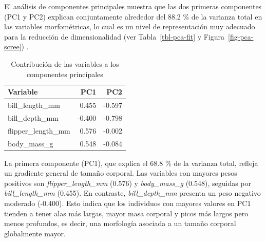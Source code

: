 \documentclass[
  spanish,
  11pt,
  a4paper,
  DIV=11,
  numbers=noendperiod]{scrartcl}
\newenvironment{Shaded}{\begin{snugshade}}{\end{snugshade}}
\newcommand{\AttributeTok}[1]{\textcolor[rgb]{0.40,0.45,0.13}{#1}}
\newcommand{\CommentTok}[1]{\textcolor[rgb]{0.37,0.37,0.37}{#1}}
\newcommand{\DecValTok}[1]{\textcolor[rgb]{0.68,0.00,0.00}{#1}}
\newcommand{\FunctionTok}[1]{\textcolor[rgb]{0.28,0.35,0.67}{#1}}
\newcommand{\NormalTok}[1]{\textcolor[rgb]{0.00,0.23,0.31}{#1}}
\newcommand{\OtherTok}[1]{\textcolor[rgb]{0.00,0.23,0.31}{#1}}
\newcommand{\SpecialCharTok}[1]{\textcolor[rgb]{0.37,0.37,0.37}{#1}}
\newcommand{\StringTok}[1]{\textcolor[rgb]{0.13,0.47,0.30}{#1}}
\begin{document}
El análisis de componentes principales muestra que las dos primeras
componentes (PC1 y PC2) explican conjuntamente alrededor del 88.2 \% de
la varianza total en las variables morfométricas, lo cual es un nivel de
representación muy adecuado para la reducción de dimensionalidad (ver
Tabla~\ref{tbl-pca-fit} y Figura~\ref{fig-pca-scree}) .

\begin{Shaded}
\end{Shaded}

\begin{longtable}[]{@{}lrr@{}}

\caption{\label{tbl-pca-loadings}Contribución de las variables a los
componentes principales}

\tabularnewline

\toprule\noalign{}
Variable & PC1 & PC2 \\
\midrule\noalign{}
\endhead
\bottomrule\noalign{}
\endlastfoot
bill\_length\_mm & 0.455 & -0.597 \\
bill\_depth\_mm & -0.400 & -0.798 \\
flipper\_length\_mm & 0.576 & -0.002 \\
body\_mass\_g & 0.548 & -0.084 \\

\end{longtable}

La primera componente (PC1), que explica el 68.8 \% de la varianza
total, refleja un gradiente general de tamaño corporal. Las variables
con mayores pesos positivos son \emph{flipper\_length\_mm} (0.576) y
\emph{body\_mass\_g} (0.548), seguidas por \emph{bill\_length\_mm}
(0.455). En contraste, \emph{bill\_depth\_mm} presenta un peso negativo
moderado (-0.400). Esto indica que los individuos con mayores valores en
PC1 tienden a tener alas más largas, mayor masa corporal y picos más
largos pero menos profundos, es decir, una morfología asociada a un
tamaño corporal globalmente mayor.
\end{document}
